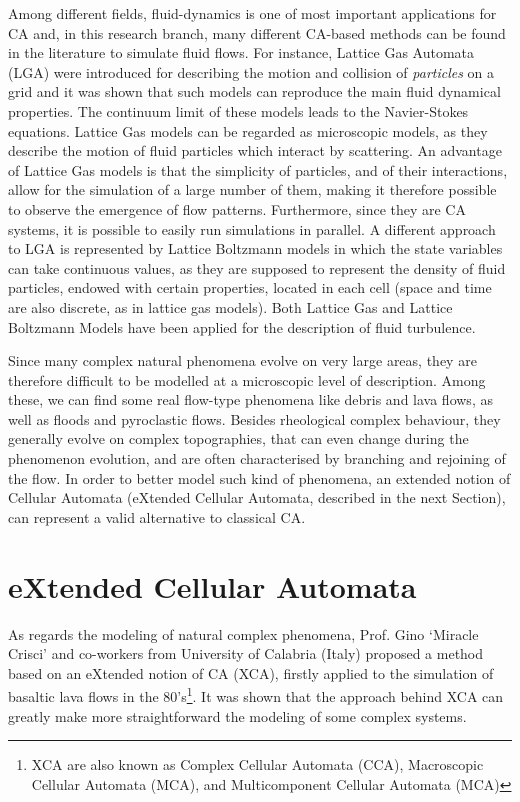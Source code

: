 Among different fields, fluid-dynamics is one of most important
applications for CA and, in this research branch, many different
CA-based methods can be found in the literature to simulate fluid
flows.  For instance, Lattice Gas Automata (LGA) were introduced for
describing the motion and collision of \emph{particles} on a grid and
it was shown that such models can reproduce the main fluid dynamical
properties. The continuum limit of these models leads to the
Navier-Stokes equations. Lattice Gas models can be regarded as
microscopic models, as they describe the motion of fluid particles
which interact by scattering. An advantage of Lattice Gas models is
that the simplicity of particles, and of their interactions, allow for
the simulation of a large number of them, making it therefore possible
to observe the emergence of flow patterns. Furthermore, since they are
CA systems, it is possible to easily run simulations in parallel. A
different approach to LGA is represented by Lattice Boltzmann models
in which the state variables can take continuous values, as they are
supposed to represent the density of fluid particles, endowed with
certain properties, located in each cell (space and time are also
discrete, as in lattice gas models). Both Lattice Gas and Lattice
Boltzmann Models have been applied for the description of fluid
turbulence.

Since many complex natural phenomena evolve on very large areas, they
are therefore difficult to be modelled at a microscopic level of
description. Among these, we can find some real flow-type phenomena
like debris and lava flows, as well as floods and pyroclastic
flows. Besides rheological complex behaviour, they generally evolve on
complex topographies, that can even change during the phenomenon
evolution, and are often characterised by branching and rejoining of
the flow. In order to better model such kind of phenomena, an extended
notion of Cellular Automata (eXtended Cellular Automata, described in
the next Section), can represent a valid alternative to classical CA.

\section{eXtended Cellular Automata}

As regards the modeling of natural complex phenomena, Prof. Gino
`Miracle Crisci' and co-workers from University of Calabria (Italy)
proposed a method based on an eXtended notion of CA (XCA), firstly
applied to the simulation of basaltic lava flows in the
80's\footnote{XCA are also known as Complex Cellular Automata (CCA),
  Macroscopic Cellular Automata (MCA), and Multicomponent Cellular
  Automata (MCA)}. It was shown that the approach behind XCA can
greatly make more straightforward the modeling of some complex
systems.

